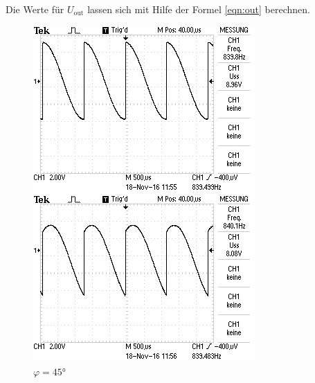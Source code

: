 Die Werte für $U_\text{out}$ lassen sich mit Hilfe der Formel \eqref{eqn:out} berechnen.\\
\newpage

\begin{figure}[!h]
\begin{minipage}[t]{0.3\textwidth}
\includegraphics[width=\textwidth]{Bilder/15.jpg}
\caption{$\varphi = 15\si{\degree}$}
\label{fig:1}
\end{minipage}
\hspace{10pt}
\vspace{5pt}
\begin{minipage}[t]{0.3\textwidth}
\includegraphics[width=\textwidth]{Bilder/45.jpg}
\caption{$\varphi = 45\si{\degree}$}

\end{minipage}
\end{figure}
